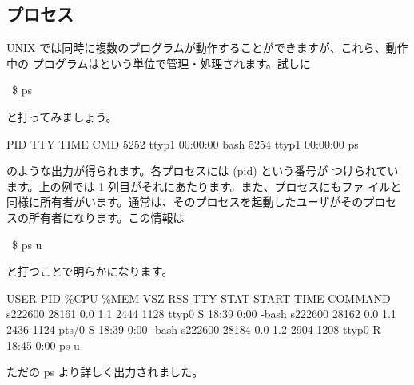 \documentclass[platex]{jsarticle}
\begin{document}
  \subsection{プロセス}
  UNIX では同時に複数のプログラムが動作することができますが、これら、動作中の
  プログラムはという単位で管理・処理されます。試しに
  \begin{terminal}~\$ ps\end{terminal}
  と打ってみましょう。
  \begin{terminal}%
 PID TTY          TIME CMD
5252 ttyp1    00:00:00 bash
5254 ttyp1    00:00:00 ps\end{terminal}
  のような出力が得られます。各プロセスには (pid) という番号が
  つけられています。上の例では 1 列目がそれにあたります。また、プロセスにもファ
  イルと同様に所有者がいます。通常は、そのプロセスを起動したユーザがそのプロセ
  スの所有者になります。この情報は
  \begin{terminal}~\$ ps u\end{terminal}
  と打つことで明らかになります。
  \begin{terminal}%
USER       PID \%CPU \%MEM   VSZ  RSS TTY      STAT START   TIME COMMAND
s222600  28161  0.0  1.1  2444 1128 ttyp0    S    18:39   0:00 -bash
s222600  28162  0.0  1.1  2436 1124 pts/0    S    18:39   0:00 -bash
s222600  28184  0.0  1.2  2904 1208 ttyp0    R    18:45   0:00 ps u\end{terminal}
  ただの ps より詳しく出力されました。
\end{document}
